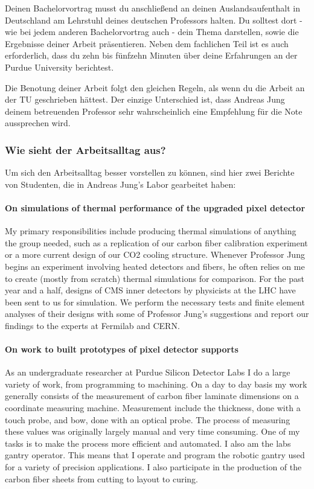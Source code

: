 \documentclass[
  paper=a4,
  fontsize=12pt,
  DIV=16,
  headheight=52pt,
  footheight=45pt,
  headinclude,
  parskip=full,
]{scrartcl}
\begin{document}
Deinen Bachelorvortrag musst du anschließend an deinen Auslandsaufenthalt in
Deutschland am Lehrstuhl deines deutschen Professors halten.
Du solltest dort - wie bei jedem anderen Bachelorvortrag auch - dein Thema
darstellen, sowie die Ergebnisse deiner Arbeit präsentieren.
Neben dem fachlichen Teil ist es auch erforderlich, dass du zehn bis fünfzehn
Minuten über deine Erfahrungen an der Purdue University berichtest.

Die Benotung deiner Arbeit folgt den gleichen Regeln, als wenn du die Arbeit an
der TU geschrieben hättest.
Der einzige Unterschied ist, dass Andreas Jung deinem betreuenden Professor
sehr wahrscheinlich eine Empfehlung für die Note aussprechen wird.

\subsubsection*{Wie sieht der Arbeitsalltag aus?}
Um sich den Arbeitsalltag besser vorstellen zu können, sind hier zwei Berichte
von Studenten, die in Andreas Jung's Labor gearbeitet haben:

\paragraph{On simulations of thermal performance of the upgraded pixel detector}
My primary responsibilities include producing thermal simulations of anything
the group needed, such as a replication of our carbon fiber calibration
experiment or a more current design of our CO2 cooling structure.
Whenever Professor Jung begins an experiment involving heated detectors and
fibers, he often relies on me to create (mostly from scratch) thermal simulations for
comparison.
For the past year and a half, designs of CMS inner detectors by physicists at
the LHC have been sent to us for simulation.
We perform the necessary tests and finite element analyses of their designs
with some of Professor Jung’s suggestions and report our findings to the
experts at Fermilab and CERN.

\paragraph{On work to built prototypes of pixel detector supports}
As an undergraduate researcher at Purdue Silicon Detector Labs I do a large
variety of work, from programming to machining.
On a day to day basis my work generally consists of the measurement of carbon
fiber laminate dimensions on a coordinate measuring machine.
Measurement include the thickness, done with a touch probe, and bow, done with
an optical probe.
The process of measuring these values was originally largely manual and very
time consuming.
One of my tasks is to make the process more efficient and automated.
I also am the labs gantry operator.
This means that I operate and program the robotic gantry used for a variety of
precision applications.
I also participate in the production of the carbon fiber sheets from cutting
to layout to curing.
\end{document}
